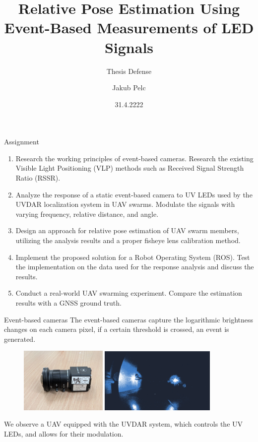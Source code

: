 \documentclass{beamer}
\title{Relative Pose Estimation Using Event-Based Measurements of LED Signals}
\subtitle{Thesis Defense}
\date{31.4.2222}
\author{Jakub Pelc}
\institute{Faculty of Electrical Engineering, Czech Technical University in Prague}
\begin{document}
\maketitle

\begin{frame}{Assignment}

\small{
\begin{enumerate}
    \item Research the working principles of event-based cameras. Research the existing Visible Light Positioning (VLP) methods such as Received Signal Strength Ratio (RSSR).
    \item Analyze the response of a static event-based camera to UV LEDs used by the UVDAR localization system in UAV swarms. Modulate the signals with varying frequency, relative distance, and angle.
    \item Design an approach for relative pose estimation of UAV swarm members, utilizing the analysis results and a proper
fisheye lens calibration method.
    \item Implement the proposed solution for a Robot Operating System (ROS). Test the implementation on the data used for
the response analysis and discuss the results.
    \item Conduct a real-world UAV swarming experiment. Compare the estimation results with a GNSS ground truth. 
\end{enumerate}
}

\end{frame}

\begin{frame}{Event-based cameras}
The event-based cameras capture the logarithmic brightness changes on each camera pixel, if a certain threshold is crossed, an event is generated.

\begin{figure}[H]
    \centering
    \includegraphics[width=0.374\textwidth]{../fig/photos/evk4.jpg}
    \includegraphics[width=0.50\textwidth]{../fig/photos/meas1.png}
    \label{fig:evk4}
\end{figure}

We observe a UAV equipped with the UVDAR system, which controls the UV LEDs, and allows for their modulation.

\end{frame}
\end{document}
